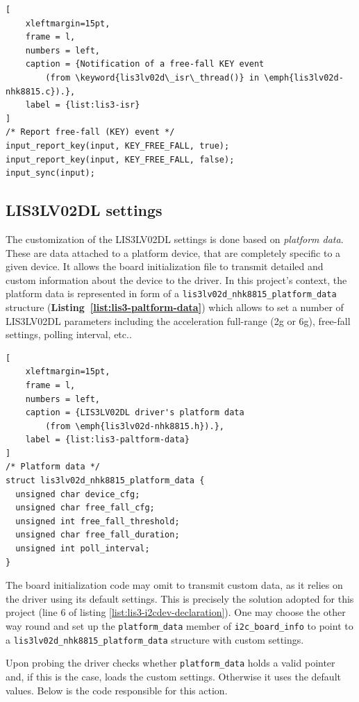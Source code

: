 \documentclass[a4paper,10pt]{article}
\newcommand{\keyword}[1]{\texttt{#1}}
\newcommand{\refl}[1]{\textbf{Listing~\ref{#1}}}
\begin{document}
\begin{multicols}{2}
\begin{lstlisting}[
	xleftmargin=15pt,
	frame = l,
	numbers = left,
	caption = {Notification of a free-fall KEY event
		(from \keyword{lis3lv02d\_isr\_thread()} in \emph{lis3lv02d-nhk8815.c}).},
	label = {list:lis3-isr}
]
/* Report free-fall (KEY) event */
input_report_key(input, KEY_FREE_FALL, true);
input_report_key(input, KEY_FREE_FALL, false);
input_sync(input);
\end{lstlisting}


\subsection{LIS3LV02DL settings}
\label{sec:lis3_settings}

The customization of the LIS3LV02DL settings is done based on \emph{platform 
data}.
These are data attached to a platform device, that are completely specific to
a given device. It allows the board initialization file to transmit detailed and
custom information about the device to the driver.
In this project's context, the platform data is represented in form of a
\keyword{lis3lv02d\_nhk8815\_platform\_data} structure
(\refl{list:lis3-paltform-data}) which allows to set a number of 
LIS3LV02DL parameters including the acceleration full-range (2g or 6g), free-fall 
settings, polling interval, etc..

\begin{lstlisting}[
	xleftmargin=15pt,
	frame = l,
	numbers = left,
	caption = {LIS3LV02DL driver's platform data
		(from \emph{lis3lv02d-nhk8815.h}).},
	label = {list:lis3-paltform-data}
]
/* Platform data */
struct lis3lv02d_nhk8815_platform_data {
  unsigned char device_cfg;
  unsigned char free_fall_cfg;
  unsigned int free_fall_threshold;
  unsigned char free_fall_duration;
  unsigned int poll_interval;
}
\end{lstlisting}

The board initialization code may omit to transmit custom data, as it relies on
the driver using its default settings. This is precisely the solution adopted for
this project (line 6 of listing \ref{list:lis3-i2cdev-declaration}).
One may choose the other way round and set up the \keyword{platform\_data}
member of \keyword{i2c\_board\_info} to point to a 
\keyword{lis3lv02d\_nhk8815\_platform\_data} structure with custom settings.

Upon probing the driver checks whether \keyword{platform\_data} holds a valid
pointer and, if this is the case, loads the custom settings. Otherwise it uses
the default values. Below is the code responsible for this action.


\end{multicols}
\end{document}
